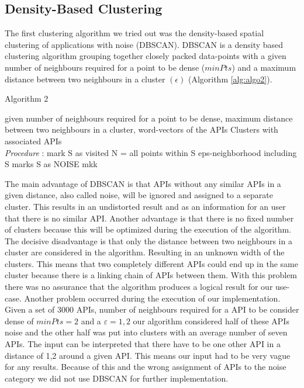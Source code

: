 \documentclass[a4paper]{IEEEtran}
\begin{document}
\subsection{Density-Based Clustering}
The first clustering algorithm we tried out was the density-based spatial clustering of applications with noise (DBSCAN). DBSCAN\cite{kanungo2002efficient} is a density based clustering algorithm grouping together closely packed data-points with a given number of neighbours required for a point to be dense ($minPts$) and a maximum distance between two neighbours in a cluster $(\epsilon)$ (Algorithm \ref{alg:algo2}). 

\begin{algorithm}[H]
 \caption{Algorithm 2}
 \begin{algorithmic}[1]
\renewcommand{\algorithmicrequire}{\textbf{Input:}}
 \renewcommand{\algorithmicensure}{\textbf{Output:}}
 \REQUIRE given number of neighbours required for a point to be dense, \newline maximum distance between two
neighbours in a cluster, \newline word-vectors of the APIs
 \ENSURE  Clusters with associated APIs
 \\ \textit{Procedure} :
\STATE mark S as visited
\STATE N = all points within S eps-neighborhood including S
\STATE marks S as NOISE
\ENDIF
 \STATE mkk
\ENDFOR
 \end{algorithmic}
 \end{algorithm}

The main advantage of DBSCAN is that APIs without any similar APIs in a given distance, also called noise, will be ignored and assigned to a separate cluster. This results in an undistorted result and as an information for an user that there is no similar API. 
Another advantage is that there is no fixed number of clusters because this will be optimized during the execution of the algorithm.
The decisive disadvantage is that only the distance between two neighbours in a cluster are considered in the algorithm. Resulting in an unknown width of the clusters. This means that two completely different APIs could end up in the same cluster because there is a linking chain of APIs between them. With this problem there was no assurance that the algorithm produces a logical result for our use-case.
Another problem occurred during the execution of our implementation. Given a set of 3000 APIs, number of neighbours required for a API to be consider dense of $minPts = 2$ and a $ε = 1,2$ our algorithm considered half of these APIs noise and the other half was put into clusters with an average number of seven APIs. The input can be interpreted that there have to be one other API in a distance of 1,2 around a given API. This means our input had to be very vague for any results. Because of this and the wrong assignment of APIs to the noise category we did not use DBSCAN for further implementation.
\end{document}
